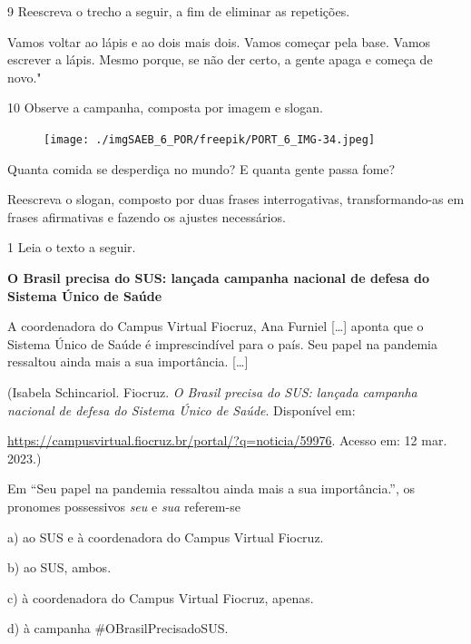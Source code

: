\num{9} Reescreva o trecho a seguir, a fim de eliminar as repetições.

Vamos voltar ao lápis e ao dois mais dois. Vamos começar pela base.
Vamos escrever a lápis. Mesmo porque, se não der certo, a gente apaga e
começa de novo."



\num{10} Observe a campanha, composta por imagem e slogan.

\begin{figure}
\texttt{[image: ./imgSAEB\_6\_POR/freepik/PORT\_6\_IMG-34.jpeg]}
\end{figure}


Quanta comida se desperdiça no mundo? E quanta gente passa fome?

Reescreva o slogan, composto por duas frases interrogativas,
transformando-as em frases afirmativas e fazendo os ajustes necessários.




\num{1} Leia o texto a seguir.

\textbf{O Brasil precisa do SUS: lançada campanha nacional de defesa do
Sistema Único de Saúde}

A coordenadora do Campus Virtual Fiocruz, Ana Furniel {[}\ldots{]}
aponta que o Sistema Único de Saúde é imprescindível para o país. Seu
papel na pandemia ressaltou ainda mais a sua importância. {[}\ldots{]}

(Isabela Schincariol. Fiocruz. \emph{O Brasil precisa do SUS: lançada
campanha nacional de defesa do Sistema Único de Saúde}. Disponível em:

\url{https://campusvirtual.fiocruz.br/portal/?q=noticia/59976}.
Acesso em: 12 mar. 2023.)

Em ``Seu papel na pandemia ressaltou ainda mais a sua importância.'', os
pronomes possessivos \emph{seu} e \emph{sua} referem-se

a) ao SUS e à coordenadora do Campus Virtual Fiocruz.

b) ao SUS, ambos.

c) à coordenadora do Campus Virtual Fiocruz, apenas.

d) à campanha \#OBrasilPrecisadoSUS.

